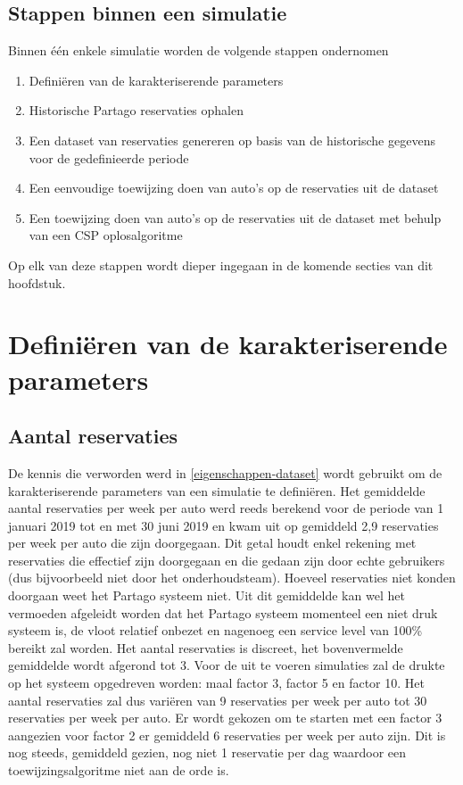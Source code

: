\subsection{Stappen binnen een simulatie}
Binnen één enkele simulatie worden de volgende stappen ondernomen
\begin{enumerate}
	\item Definiëren van de karakteriserende parameters
	\item Historische Partago reservaties ophalen
	\item Een dataset van reservaties genereren op basis van de historische gegevens voor de gedefinieerde periode
	\item Een eenvoudige toewijzing doen van auto's op de reservaties uit de dataset
	\item Een toewijzing doen van auto's op de reservaties uit de dataset met behulp van een CSP oplosalgoritme 
	
\end{enumerate}
Op elk van deze stappen wordt dieper ingegaan in de komende secties van dit hoofdstuk. 

\section{Definiëren van de karakteriserende parameters} \label{karakteriserende-parameters}
\subsection{Aantal reservaties}
De kennis die verworden werd in \ref{eigenschappen-dataset} wordt gebruikt om de karakteriserende parameters van een simulatie te definiëren. Het gemiddelde aantal reservaties per week per auto werd reeds berekend voor de periode van 1 januari 2019 tot en met 30 juni 2019 en kwam uit op gemiddeld 2,9 reservaties per week per auto die zijn doorgegaan. Dit getal houdt enkel rekening met reservaties die effectief zijn doorgegaan en die gedaan zijn door echte gebruikers (dus bijvoorbeeld niet door het onderhoudsteam). Hoeveel reservaties niet konden doorgaan weet het Partago systeem niet. Uit dit gemiddelde kan wel het vermoeden afgeleidt worden dat het Partago systeem momenteel een niet druk systeem is, de vloot relatief onbezet en nagenoeg een service level van 100\% bereikt zal worden. Het aantal reservaties is discreet, het bovenvermelde gemiddelde wordt afgerond tot 3. Voor de uit te voeren simulaties zal de drukte op het systeem opgedreven worden: maal factor 3, factor 5 en factor 10. Het aantal reservaties zal dus variëren van 9 reservaties per week per auto tot 30 reservaties per week per auto. Er wordt gekozen om te starten met een factor 3 aangezien voor factor 2 er gemiddeld 6 reservaties per week per auto zijn. Dit is nog steeds, gemiddeld gezien, nog niet 1 reservatie per dag waardoor een toewijzingsalgoritme niet aan de orde is.
